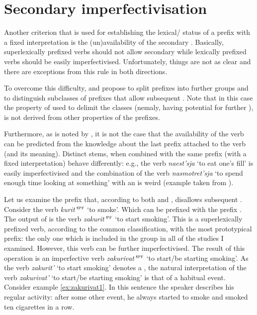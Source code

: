 \section{Secondary imperfectivisation}\label{section:new:imperfectivization}
Another criterion that is used for establishing the lexical/ status of a prefix with a fixed interpretation is the (un)availability of the secondary . Basically, superlexically prefixed verbs should not allow secondary  while lexically prefixed verbs should be easily imperfectivised. Unfortunately, things are not as clear and there are exceptions from this rule in both directions. 

To overcome this difficulty, \citet{Svenonius:04b} and \citet{Tatevosov:07, Tatevosov:09} propose to split  prefixes into further groups and to distinguish subclasses of  prefixes that allow subsequent . Note that in this case the property of used to delimit the classes (nemaly, having potential for further ), is not derived from other properties of the prefixes.

Furthermore, as is noted by \citet[35]{Kagan:book}, it is not the case that the availability of the  verb can be predicted from the knowledge about the last prefix attached to the verb (and its meaning). Distinct stems, when combined with the same prefix (with a fixed interpretation) behave differently: e.g., the verb \textit{naest’sja} `to eat one's fill' is easily imperfectivised and the combination of the verb \textit{nasmotret'sja} `to spend enough time looking at something' with an  is weird (example taken from \citealt[35]{Kagan:book}).

Let us examine the  prefix  that, according to both \citet[230]{Svenonius:04b} and \citet[116]{Tatevosov:09}, disallows subsequent . Consider the verb \textit{kurit'}$^{\textsc{ipf}}$ `to smoke'. Which can be prefixed with the  prefix {.} The output of  is the verb \textit{zakurit'}$^{\textsc{pf}}$ `to start smoking'. This is a superlexically prefixed verb, according to the common classification, with the most prototypical  prefix: the only one which is included in the  group in all of the studies I examined. However, this verb can be further imperfectivised. The result of this operation is an imperfective verb \textit{zakurivat'}$^{\textsc{ipf}}$ `to start/be starting smoking'. As the verb \textit{zakurit'} `to start smoking' denotes a , the natural interpretation of the verb \textit{zakurivat'} `to start/be starting smoking'  is that of a habitual event. Consider example \ref{ex:zakurivat1}. In this sentence the speaker describes his regular activity: after some other event, he always started to smoke and smoked ten cigarettes in a row. 

